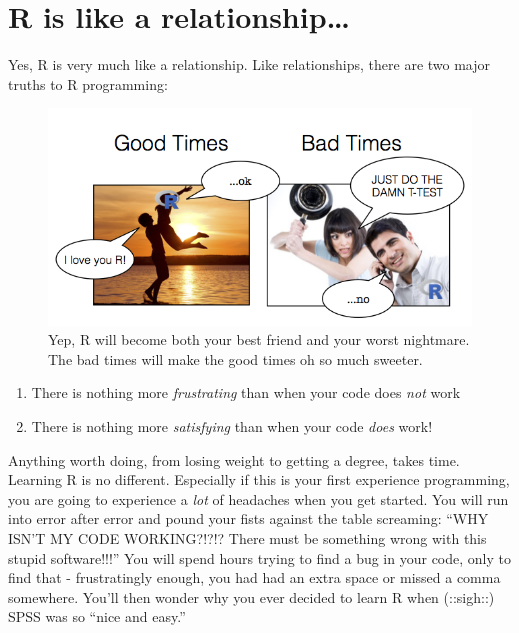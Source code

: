 \documentclass[]{book}
\theoremstyle{definition}
\theoremstyle{definition}
\theoremstyle{remark}
\begin{document}
\section{R is like a
relationship\ldots{}}\label{r-is-like-a-relationship}

Yes, R is very much like a relationship. Like relationships, there are
two major truths to R programming:

\begin{figure}

{\centering \includegraphics{images/rrelationship} 

}

\caption{Yep, R will become both your best friend and your worst nightmare. The bad times will make the good times oh so much sweeter.}\label{fig:unnamed-chunk-4}
\end{figure}

\begin{enumerate}
\def\labelenumi{\arabic{enumi}.}
\item
  There is nothing more \emph{frustrating} than when your code does
  \emph{not} work
\item
  There is nothing more \emph{satisfying} than when your code
  \emph{does} work!
\end{enumerate}

Anything worth doing, from losing weight to getting a degree, takes
time. Learning R is no different. Especially if this is your first
experience programming, you are going to experience a \emph{lot} of
headaches when you get started. You will run into error after error and
pound your fists against the table screaming: ``WHY ISN'T MY CODE
WORKING?!?!? There must be something wrong with this stupid
software!!!'' You will spend hours trying to find a bug in your code,
only to find that - frustratingly enough, you had had an extra space or
missed a comma somewhere. You'll then wonder why you ever decided to
learn R when (::sigh::) SPSS was so ``nice and easy.''
\end{document}
